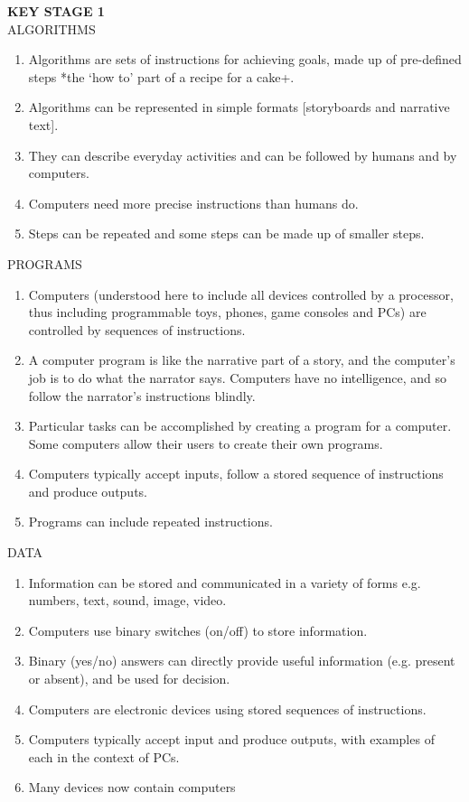 \textbf{KEY STAGE 1}\\
ALGORITHMS
\begin{enumerate}
\item Algorithms are sets of instructions for achieving goals, made up of pre-defined steps
*the ‘how to’ part of a recipe for a cake+.
\item Algorithms can be represented in simple formats [storyboards and narrative text].
\item They can describe everyday activities and can be followed by humans and by
computers.
\item Computers need more precise instructions than humans do.
\item Steps can be repeated and some steps can be made up of smaller steps.
\end{enumerate}
PROGRAMS
\begin{enumerate}
\item Computers (understood here to include all devices controlled by a processor, thus
including programmable toys, phones, game consoles and PCs) are controlled by
sequences of instructions.
\item A computer program is like the narrative part of a story, and the computer’s job is to
do what the narrator says. Computers have no intelligence, and so follow the
narrator’s instructions blindly.
\item Particular tasks can be accomplished by creating a program for a computer. Some
computers allow their users to create their own programs.
\item Computers typically accept inputs, follow a stored sequence of instructions and
produce outputs.
\item Programs can include repeated instructions.
\end{enumerate}
DATA
\begin{enumerate}
\item Information can be stored and communicated in a variety of forms e.g. numbers,
text, sound, image, video.
\item Computers use binary switches (on/off) to store information.
\item Binary (yes/no) answers can directly provide useful information (e.g. present or
absent), and be used for decision.
\item Computers are electronic devices using stored sequences of instructions.
\item Computers typically accept input and produce outputs, with examples of each in the
context of PCs.
\item Many devices now contain computers
\end{enumerate}
